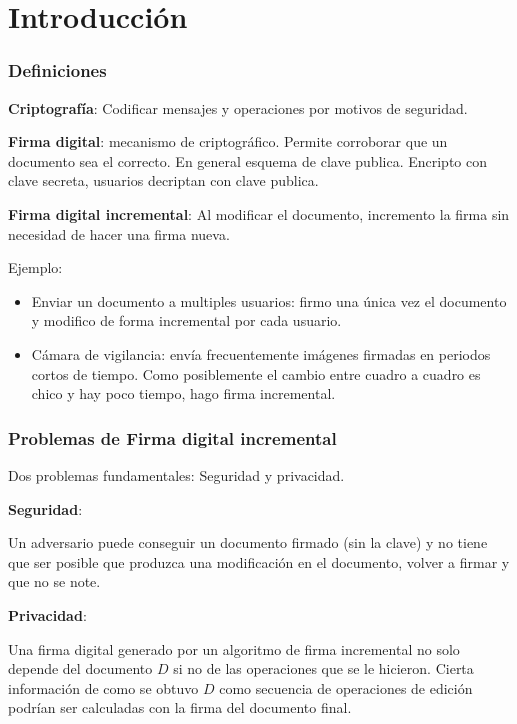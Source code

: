 \documentclass[10pt]{beamer}
\begin{document}
\section{Introducción}
\begin{frame}
\frametitle{Definiciones}
\textbf{Criptografía}: Codificar mensajes y operaciones por motivos de seguridad.

\pause
\textbf{Firma digital}: mecanismo de criptográfico. Permite corroborar que un documento sea el correcto.
En general esquema de clave publica. Encripto con clave secreta, usuarios decriptan con clave publica.
\pause

\textbf{Firma digital incremental}: Al modificar el documento, incremento la
firma sin necesidad de hacer una firma nueva.

\pause
Ejemplo:
\begin{itemize}
  \item Enviar un documento a multiples usuarios: firmo una única vez el documento
    y modifico de forma incremental por cada usuario.
\pause
  \item Cámara de vigilancia: envía frecuentemente imágenes firmadas en periodos cortos de tiempo.
        Como posiblemente el cambio entre cuadro a cuadro es chico y hay poco tiempo, hago firma incremental.
\end{itemize}

\end{frame}

\begin{frame}
\frametitle{Problemas de Firma digital incremental}

Dos problemas fundamentales: Seguridad y privacidad.

\pause
\textbf{Seguridad}:

Un adversario puede conseguir un documento firmado (sin la clave) y no tiene que ser posible
que produzca una modificación en el documento, volver a firmar y que no se note.

\pause
\textbf{Privacidad}:

Una firma digital generado por un algoritmo de firma incremental no solo depende del documento
$D$ si no de las operaciones que se le hicieron.
Cierta información de como se  obtuvo $D$ como secuencia de operaciones de edición podrían ser
calculadas con la firma del documento final.
\end{frame}
\end{document}
